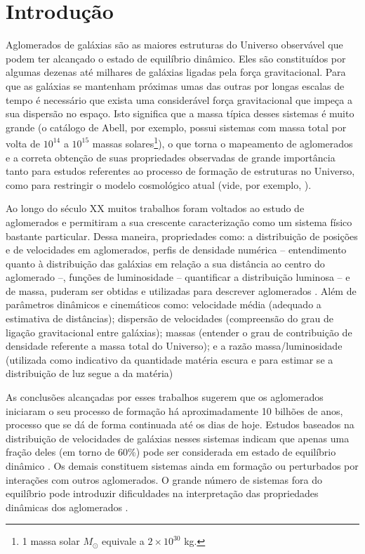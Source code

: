 %
%

\chapter{Introdução}\label{chap:introducao}
Aglomerados de galáxias são as maiores estruturas do Universo observável que podem ter alcançado o estado de equilíbrio dinâmico. Eles são constituídos por algumas dezenas até milhares de galáxias ligadas pela força gravitacional. Para que as galáxias se mantenham próximas umas das outras por longas escalas de tempo é necessário que exista uma considerável força gravitacional que impeça a sua dispersão no espaço. Isto significa que a massa típica desses sistemas é muito grande (o catálogo de Abell, por exemplo, possui sistemas com massa total por volta de $10^{14}$ a $10^{15}$ massas solares\footnote{1 massa solar ${M_\odot}$ equivale a $2\times 10^{30}$ kg.}), o que torna o mapeamento de aglomerados e a correta obtenção de suas propriedades observadas de grande importância tanto para estudos referentes ao processo de formação de estruturas no Universo, como para restringir o modelo cosmológico atual (vide, por exemplo, ).

Ao longo do século XX muitos trabalhos foram voltados ao estudo de aglomerados e permitiram a sua crescente caracterização como um sistema físico bastante particular. Dessa maneira, propriedades como: a distribuição de posições e de velocidades em aglomerados, perfis de densidade numérica – entendimento quanto à distribuição das galáxias em relação a sua distância ao centro do aglomerado –, funções de luminosidade – quantificar a distribuição luminosa – e de massa, puderam ser obtidas e utilizadas para descrever aglomerados \cite{VELASQUEZ2012}. Além de parâmetros dinâmicos e cinemáticos como: velocidade média (adequado a estimativa de distâncias); dispersão de velocidades (compreensão do grau de ligação gravitacional entre galáxias); massas (entender o grau de contribuição de densidade referente a massa total do Universo); e a razão massa/luminosidade (utilizada como indicativo da quantidade matéria escura e para estimar se a distribuição de luz segue a da matéria) \cite{friaca2008}

As conclusões alcançadas por esses trabalhos sugerem que os aglomerados iniciaram o seu processo de formação há aproximadamente 10 bilhões de anos, processo que se dá de forma continuada até os dias de hoje. Estudos baseados na distribuição de velocidades de galáxias nesses sistemas indicam que apenas uma fração deles (em torno de 60\%) pode ser considerada em estado de equilíbrio dinâmico \cite{RAQUEL2012}. Os demais constituem sistemas ainda em formação ou perturbados por interações com outros aglomerados. O grande número de sistemas fora do equilíbrio pode introduzir dificuldades na interpretação das propriedades dinâmicas dos aglomerados \cite{friaca2008}.

